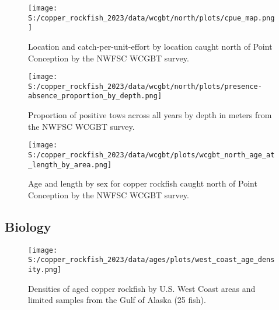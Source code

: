 \documentclass[11pt,
  letterpaper,
]{article}
\begin{document}
\begin{figure}
{\centering
\texttt{[image: S:/copper\_rockfish\_2023/data/wcgbt/north/plots/cpue\_map.png]}
}
\caption{Location and catch-per-unit-effort by location caught north of Point Conception by the NWFSC WCGBT survey.\label{fig:wcgbt-cpue}}
\end{figure}

\pagebreak

\begin{figure}
{\centering
\texttt{[image: S:/copper\_rockfish\_2023/data/wcgbt/north/plots/presence-absence\_proportion\_by\_depth.png]}
}
\caption{Proportion of positive tows across all years by depth in meters from the NWFSC WCGBT survey.\label{fig:wcgbt-depth}}
\end{figure}

\pagebreak

\begin{figure}
{\centering
\texttt{[image: S:/copper\_rockfish\_2023/data/wcgbt/plots/wcgbt\_north\_age\_at\_length\_by\_area.png]}
}
\caption{Age and length by sex for copper rockfish caught north of Point Conception by the NWFSC WCGBT survey.\label{fig:wcgbt-len-age}}
\end{figure}

\pagebreak

\subsection{Biology}\label{biology}

\begin{figure}
{\centering
\texttt{[image: S:/copper\_rockfish\_2023/data/ages/plots/west\_coast\_age\_density.png]}
}
\caption{Densities of aged copper rockfish by U.S. West Coast areas and limited samples from the Gulf of Alaska (25 fish).\label{fig:west-coast-age-density}}
\end{figure}
\end{document}
